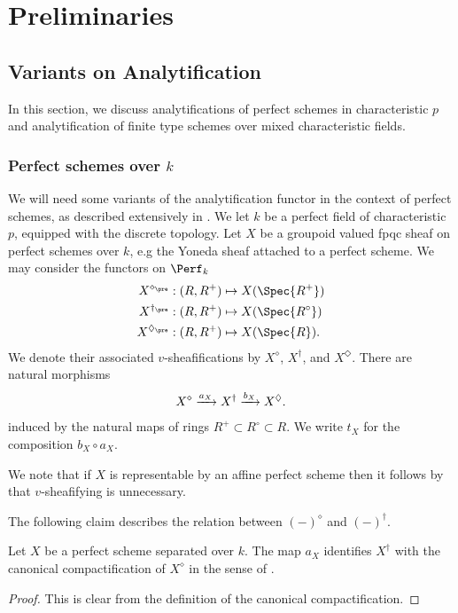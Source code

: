 \documentclass[letterpaper,11pt]{amsart}
\begin{document}
\section{Preliminaries}\label{sec: prelim}
\subsection{Variants on Analytification}{\label{ss: Analytification}}
In this section, we discuss analytifications of perfect schemes in characteristic $p$ and analytification of finite type schemes over mixed characteristic fields. 

\subsubsection{Perfect schemes over $k$}{\label{ss: analytificationofperfectschemes}}
We will need some variants of the analytification functor in the context of perfect schemes, as described extensively in \cite[Section~4.2]{GHILZIsocComparison}. We let $k$ be a perfect field of characteristic $p$, equipped with the discrete topology. Let $X$ be a groupoid valued fpqc sheaf on perfect schemes over $k$, e.g the Yoneda sheaf attached to a perfect scheme. We may consider the functors on $\Perf_{k}$
	\begin{align*}
		\label{some functors pre}
		X^{\diamond_\pre}:(R,R^{+})& \mapsto X(\Spec{R^{+}}) \\
		X^{\dagger_\pre}:(R,R^{+})& \mapsto X(\Spec{R^\circ}) \\
		X^{\Diamond_\pre}:(R,R^{+})& \mapsto X(\Spec{R}).
	\end{align*}
    We denote their associated $v$-sheafifications by $X^{\diamond}$, $X^{\dagger}$, and $X^{\Diamond}$. There are natural morphisms 
    \begin{equation}{\label{eqn: NaturalTransformationsofAnalytifications}}
    X^{\diamond} \xrightarrow{a_{X}} X^{\dagger} \xrightarrow{b_{X}} X^{\Diamond}. 
    \end{equation}
    induced by the natural maps 
    of rings $R^{+} \subset R^{\circ} \subset R$. We write $t_{X}$ for the composition $b_{X} \circ a_{X}$. 
    \begin{remark}{\label{rem: representablevsheafifyingautomatic}}
    We note that if $X$ is representable by an affine perfect scheme then it follows by \cite[Theorem 8.7]{Ecod} that $v$-sheafifying is unnecessary. 
    \end{remark}
    The following claim describes the relation between $(-)^{\diamond}$ and $(-)^{\dagger}$.
    \begin{lemma}\label{lem: DaggerisCC}
        Let $X$ be a perfect scheme separated over $k$. The map $a_X$ identifies $X^\dagger$ with the canonical compactification of $X^\diamond$ in the sense of \cite[Section 18]{Ecod}.
    \end{lemma}
    \begin{proof}
        This is clear from the definition of the canonical compactification.
    \end{proof}
    
\end{document}
